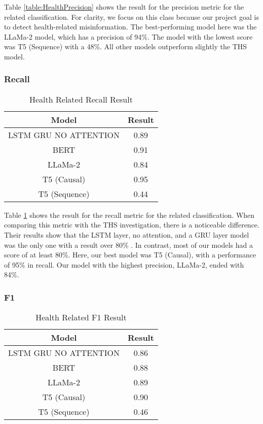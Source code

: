 Table \ref{table:HealthPrecision} shows the result for the precision metric for the related classification. For clarity, we focus on this class because our project
goal is to detect health-related misinformation. The best-performing model here was the LLaMa-2 model, which has a precision of 94\%. The model with the lowest
score was T5 (Sequence) with a 48\%. All other models outperform slightly the THS model.

\subsubsection{Recall}
\begin{table}[H]
	\centering
	\caption{Health Related Recall Result}
	{\small
	\begin{tabular}{||c | c||} 
		\hline
		\textbf{Model} & \textbf{Result} \\
		\hline
		LSTM GRU NO ATTENTION & 0.89  \\
		\hline
		BERT & 0.91  \\
		\hline
		LLaMa-2 & 0.84 \\ 
		\hline
		T5 (Causal) & 0.95 \\
		\hline
		T5 (Sequence) & 0.44 \\
		\hline
	\end{tabular}
	}
	\label{table:HealthRecall}
\end{table}

Table \ref{table:HealthRecall} shows the result for the recall metric for the related classification. When comparing this metric with the THS investigation, there is a noticeable difference. Their results
show that the LSTM layer, no attention, and a GRU layer model was the only one with a result over 80\% \cite{8622504}. In contrast, most of our models had a score of at least 80\%. 
Here, our best model was T5 (Causal), with a performance of 95\% in recall. Our model with the highest precision, LLaMa-2, ended with 84\%.

\subsubsection{F1}
\begin{table}[H]
	\centering
	\caption{Health Related F1 Result}
	{\small
	\begin{tabular}{||c | c||} 
		\hline
		\textbf{Model} & \textbf{Result} \\
		\hline
		LSTM GRU NO ATTENTION & 0.86  \\
		\hline
		BERT & 0.88  \\
		\hline
		LLaMa-2 & 0.89 \\ 
		\hline
		T5 (Causal) & 0.90 \\
		\hline
		T5 (Sequence) & 0.46 \\
		\hline
	\end{tabular}
	}
	\label{table:HealthF1}
\end{table}

